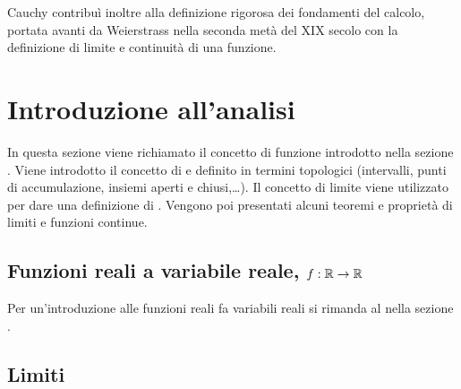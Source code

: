 \documentclass[letterpaper,10pt,italian]{jupyterBook}
\begin{document}
\sphinxAtStartPar
Cauchy contribuì inoltre alla definizione rigorosa dei fondamenti del calcolo, portata avanti da Weierstrass nella seconda metà del XIX secolo con la definizione di limite e continuità di una funzione.



\sphinxstepscope


\chapter{Introduzione all’analisi}
\label{\detokenize{ch/infinitesimal_calculus/analysis:introduzione-all-analisi}}\label{\detokenize{ch/infinitesimal_calculus/analysis:infinitesimal-calculus-analysis}}\label{\detokenize{ch/infinitesimal_calculus/analysis::doc}}
\sphinxAtStartPar
In questa sezione viene richiamato il concetto di funzione introdotto nella sezione {\hyperref[\detokenize{ch/precalculus:math-hs-precalculus}]{}}. Viene introdotto il concetto di {\hyperref[\detokenize{ch/infinitesimal_calculus/analysis:infinitesimal-calculus-limits}]{}} e definito in termini topologici (intervalli, punti di accumulazione, insiemi aperti e chiusi,…). Il concetto di limite viene utilizzato per dare una definizione di {\hyperref[\detokenize{ch/infinitesimal_calculus/analysis:infinitesimal-calculus-continuous-fun}]{}}. Vengono poi presentati alcuni teoremi e proprietà di limiti e funzioni continue.




\section{Funzioni reali a variabile reale, \protect\(f: \mathbb{R} \rightarrow \mathbb{R}\protect\)}
\label{\detokenize{ch/infinitesimal_calculus/analysis:funzioni-reali-a-variabile-reale-f-mathbb-r-rightarrow-mathbb-r}}\label{\detokenize{ch/infinitesimal_calculus/analysis:infinitesimal-calculus-analysis-real-functions}}
\sphinxAtStartPar
Per un’introduzione alle funzioni reali fa variabili reali si rimanda al {\hyperref[\detokenize{ch/precalculus/real-functions:math-hs-precalculus-real-functions}]{}} nella sezione {\hyperref[\detokenize{ch/precalculus:math-hs-precalculus}]{}}.




\section{Limiti}
\label{\detokenize{ch/infinitesimal_calculus/analysis:limiti}}\label{\detokenize{ch/infinitesimal_calculus/analysis:infinitesimal-calculus-limits}}
\end{document}

